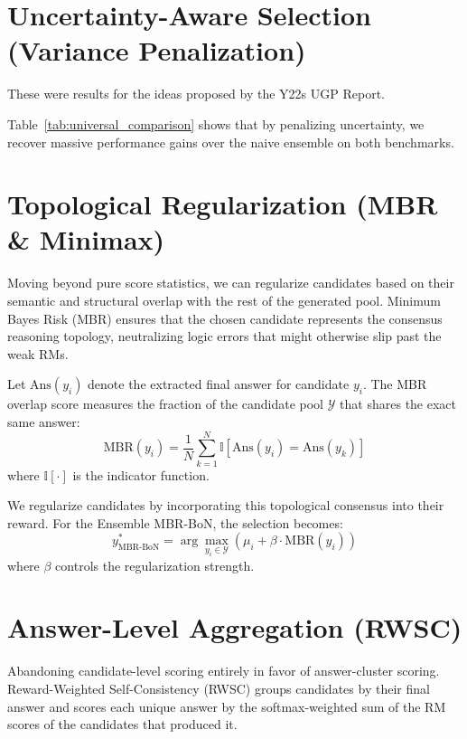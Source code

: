 \documentclass[a4paper,11pt]{article}
\begin{document}
\section{Uncertainty-Aware Selection (Variance Penalization)}
\label{sec:variance}
These were results for the ideas proposed by the Y22s UGP Report.

Table~\ref{tab:universal_comparison} shows that by penalizing uncertainty, we recover massive performance gains over the naive ensemble on both benchmarks.

\section{Topological Regularization (MBR \& Minimax)}
\label{sec:topo}
Moving beyond pure score statistics, we can regularize candidates based on their semantic and structural overlap with the rest of the generated pool. Minimum Bayes Risk (MBR) ensures that the chosen candidate represents the consensus reasoning topology, neutralizing logic errors that might otherwise slip past the weak RMs.

Let $\text{Ans}(y_i)$ denote the extracted final answer for candidate $y_i$. The MBR overlap score measures the fraction of the candidate pool $\mathcal{Y}$ that shares the exact same answer:
\begin{equation}
\label{eq:mbr}
\text{MBR}(y_i) = \frac{1}{N} \sum_{k=1}^N \mathbb{I}\left[ \text{Ans}(y_i) = \text{Ans}(y_k) \right]
\end{equation}
where $\mathbb{I}[\cdot]$ is the indicator function.

We regularize candidates by incorporating this topological consensus into their reward. For the Ensemble MBR-BoN, the selection becomes:
\begin{equation}
\label{eq:mbr_bon}
y^*_{\text{MBR-BoN}} = \arg\max_{y_i \in \mathcal{Y}} \left( \mu_i + \beta \cdot \text{MBR}(y_i) \right)
\end{equation}
where $\beta$ controls the regularization strength.

\section{Answer-Level Aggregation (RWSC)}
\label{sec:rwsc}
Abandoning candidate-level scoring entirely in favor of answer-cluster scoring. Reward-Weighted Self-Consistency (RWSC) groups candidates by their final answer and scores each unique answer by the softmax-weighted sum of the RM scores of the candidates that produced it.
\end{document}
